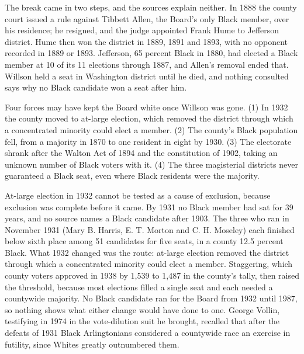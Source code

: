 The break came in two steps, and the sources explain neither. In 1888 the county
court issued a rule against Tibbett Allen, the Board's only Black member, over
his residence; he resigned, and the judge appointed Frank Hume to Jefferson
district.\autocite{alexandriagazette1888rule} Hume then won the district in 1889, 1891 and 1893,
with no opponent recorded in 1889 or 1893.\autocite{alexandriagazette18890525p3,%
alexandriagazette18930526p3} Jefferson, 65 percent Black in 1880, had elected a
Black member at 10 of its 11 elections through 1887, and Allen's removal ended
that. Willson held a seat in Washington district until he died, and nothing
consulted says why no Black candidate won a seat after him.

Four forces may have kept the Board white once Willson was gone. (1) In 1932
the county moved to at-large election, which removed the district through which
a concentrated minority could elect a member. (2) The county's Black population
fell, from a majority in 1870 to one resident in eight by 1930. (3) The
electorate shrank after the Walton Act of 1894 and the constitution of 1902,
taking an unknown number of Black voters with it. (4) The three magisterial
districts never guaranteed a Black seat, even where Black residents were the
majority.

At-large election in 1932 cannot be tested as a cause of exclusion, because
exclusion was complete before it came. By 1931 no Black member had sat for 39
years, and no source names a Black candidate after 1903. The three who ran in
November 1931 (Mary B. Harris, E. T. Morton and C. H. Moseley) each finished
below sixth place among 51 candidates for five seats, in a county 12.5 percent
Black.\autocite[67]{anderson1958} What 1932 changed was the route: at-large
election removed the district through which a concentrated minority could elect
a member. Staggering, which county voters approved in 1938 by 1,539 to 1,487 in
the county's tally, then raised the threshold, because most elections filled a
single seat and each needed a countywide
majority.\autocite[11]{arlingtonelections2021} No Black candidate ran for the
Board from 1932 until 1987, so nothing shows what either change would have done
to one.\autocite[22--23]{pratt1995}\fnsep\autocite[217--218]{bestebreurtje2017}
George Vollin, testifying in 1974 in the vote-dilution suit he brought,
recalled that after the defeats of 1931 Black Arlingtonians considered a
countywide race an exercise in futility, since Whites greatly outnumbered
them.\autocite[22--23]{pratt1995}

